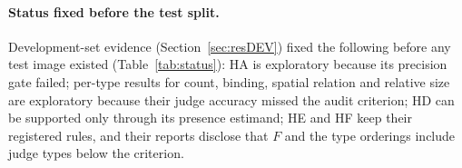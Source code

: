\paragraph{Status fixed before the test split.} Development-set evidence (Section~\ref{sec:resDEV}) fixed the following before any test image existed (Table~\ref{tab:status}): HA is exploratory because its precision gate failed; per-type results for count, binding, spatial relation and relative size are exploratory because their judge accuracy missed the audit criterion; HD can be supported only through its presence estimand; HE and HF keep their registered rules, and their reports disclose that $F$ and the type orderings include judge types below the criterion.

